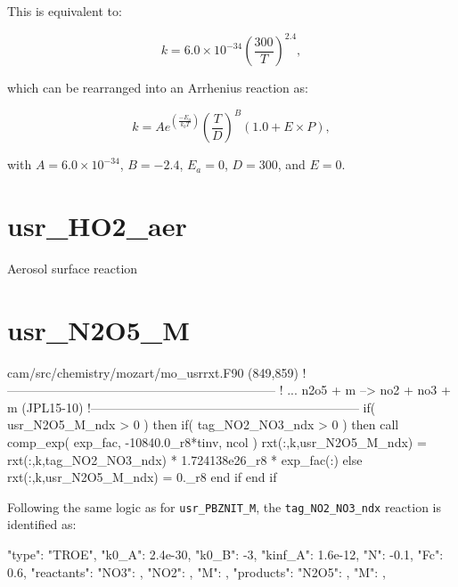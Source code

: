 \documentclass[titlepage]{article}
\begin{document}
This is equivalent to:

\begin{equation}
k = 6.0 \times 10^{-34} \left(\frac{300}{T}\right)^{2.4},
\end{equation}

\noindent which can be rearranged into an Arrhenius reaction as:

\begin{equation}
k = Ae^{(\frac{-E_a}{k_bT})}(\frac{T}{D})^B(1.0+E \times P),
\end{equation}

\noindent with $A = 6.0 \times 10^{-34}$, $B = -2.4$, $E_a = 0$, $D = 300$, and $E = 0$.


\section{usr\_HO2\_aer}

Aerosol surface reaction


\section{usr\_N2O5\_M}

\begin{blockcode}[commandchars=\\\{\}]
\color{gray}cam/src/chemistry/mozart/mo_usrrxt.F90 (849,859)
!-----------------------------------------------------------------
! ... n2o5 + m --> no2 + no3 + m (JPL15-10)
!-----------------------------------------------------------------
       if( usr_N2O5_M_ndx > 0 ) then
          if( tag_NO2_NO3_ndx > 0 ) then
             call comp_exp( exp_fac, -10840.0_r8*tinv, ncol )
             rxt(:,k,usr_N2O5_M_ndx) = rxt(:,k,tag_NO2_NO3_ndx) * 1.724138e26_r8 * exp_fac(:)
          else
             rxt(:,k,usr_N2O5_M_ndx) = 0._r8
          end if
       end if
\end{blockcode}

Following the same logic as for \verb>usr_PBZNIT_M>, the \verb>tag_NO2_NO3_ndx> reaction is identified as:

\begin{blockcode}
        {
          "type": "TROE",
          "k0_A": 2.4e-30,
          "k0_B": -3,
          "kinf_A": 1.6e-12,
          "N": -0.1,
          "Fc": 0.6,
          "reactants": {
            "NO3": { },
            "NO2": { },
            "M": { }
          },
          "products": {
            "N2O5": { },
            "M": { }
          }
        },
\end{blockcode}
\end{document}
